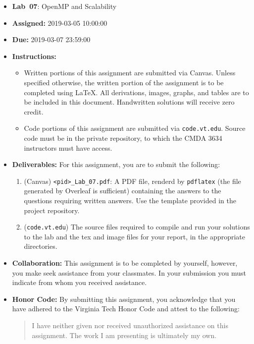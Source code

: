 \documentclass[letter]{article}
\title{\coursenumber \coursecrn}
\date{}
\newcommand{\assignmenttype}{Lab}
\newcommand{\assignmentnumber}{07}
\newcommand{\assignmentreleasedate}{2019-03-05 10:00:00}
\newcommand{\assignmentduedate}{2019-03-07 23:59:00}
\newcommand{\assignmenttitle}{OpenMP and Scalability}
\begin{document}
\thispagestyle{fancy}%

\begin{itemize}[leftmargin=*]
    \item[] \textbf{\assignmenttype~\assignmentnumber}: \assignmenttitle
    \item[] \textbf{Assigned: } \assignmentreleasedate
    \item[] \textbf{Due: } \assignmentduedate
    \item[] \textbf{Instructions: }
        \begin{itemize}
            \item Written portions of this assignment are submitted via Canvas.  Unless specified otherwise, the written portion of the assignment is to be completed using LaTeX.  All derivations, images, graphs, and tables are to be included in this document.  Handwritten solutions will receive zero credit.
            \item Code portions of this assignment are submitted via \texttt{code.vt.edu}.  Source code must be in the private repository, to which the CMDA 3634 instructors must have access.
        \end{itemize}
    \item[] \textbf{Deliverables:} For this assignment, you are to submit the following:
        \begin{enumerate}
            \item (Canvas) \texttt{<pid>\_\assignmenttype\_07.pdf}: A PDF file, renderd by \texttt{pdflatex} (the file generated by Overleaf is sufficient) containing the answers to the questions requiring written answers.  Use the template provided in the project repository. 
            \item (\texttt{code.vt.edu}) The source files required to compile and run your solutions to the lab and the tex and image files for your report, in the appropriate directories.
        \end{enumerate}
    \item[] \textbf{Collaboration: } This assignment is to be completed by yourself, however, you make seek assistance from your classmates.  In your submission you must indicate from whom you received assistance.
    \item[] \textbf{Honor Code: } By submitting this assignment, you acknowledge that you have adhered to the Virginia Tech Honor Code and attest to the following:
        \begin{quote}
           I have neither given nor received unauthorized assistance on this assignment.  The work I am presenting is ultimately my own.
        \end{quote}
\end{itemize}
\end{document}
